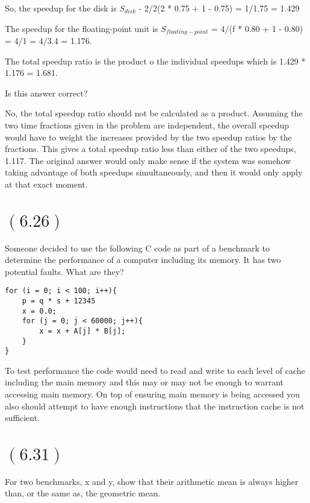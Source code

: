 \documentclass[letterpaper,12pt,titlepage]{article}
\begin{document}
So, the speedup for the disk is $S_{disk}$ - 2/2(2 * 0.75 + 1 - 0.75) = 1/1.75 = 1.429

The speedup for the floating-point unit is $S_{floating-point}$ = 4/(f * 0.80 + 1 - 0.80) = 4/1 = 4/3.4 = 1.176.

The total speedup ratio is the product o the individual speedups which is 1.429 * 1.176 = 1.681.

Is this answer correct?

\begin{mdframed}[style=MyFrame]
No, the total speedup ratio should not be calculated as a product. Assuming the two time fractions given in the problem are independent, the overall speedup would have to weight the increases provided by the two speedup ratios by the fractions. This gives a total speedup ratio less than either of the two speedups, 1.117. The original answer would only make sense if the system was somehow taking advantage of both speedups simultaneously, and then it would only apply at that exact moment. 
\end{mdframed}

\section*{$(6.26)$} Someone decided to use the following C code as part of a benchmark to determine the performance of a computer including its memory. It has two potential faults. What are they?

\begin{verbatim}
for (i = 0; i < 100; i++){
    p = q * s + 12345
    x = 0.0;
    for (j = 0; j < 60000; j++){
    	x = x + A[j] * B[j];
    }
}
\end{verbatim}

\begin{mdframed}[style=MyFrame]
To test performance the code would need to read and write to each level of cache including the main memory and this may or may not be enough to warrant accessing main memory. On top of ensuring main memory is being accessed you also should attempt to have enough instructions that the instruction cache is not sufficient. 
\end{mdframed}
\newpage
\section*{$(6.31)$} For two benchmarks, x and y, show that their arithmetic mean is always higher than, or the same as, the geometric mean.
\end{document}
